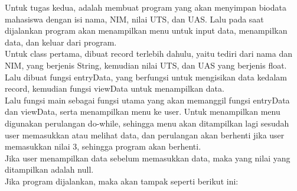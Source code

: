 \documentclass[a4paper,12pt]{article}
\begin{document}
Untuk tugas kedua, adalah membuat program yang akan menyimpan biodata mahasiswa dengan isi nama, NIM, nilai UTS,
dan UAS. Lalu pada saat dijalankan program akan menampilkan menu untuk input data, menampilkan data, dan keluar dari
program.\\
Untuk class pertama, dibuat record terlebih dahulu, yaitu tediri dari nama dan NIM, yang berjenis String, kemudian nilai
UTS, dan UAS yang berjenis float.\\
Lalu dibuat fungsi entryData, yang berfungsi untuk mengisikan data kedalam record, kemudian fungsi viewData untuk
menampilkan data.\\
Lalu fungsi main sebagai fungsi utama yang akan memanggil fungsi entryData dan viewData, serta menampilkan menu ke user.
Untuk menampilkan menu digunakan perulangan do-while, sehingga menu akan ditampilkan lagi sesudah user memasukkan atau
melihat data, dan perulangan akan berhenti jika user memasukkan nilai 3, sehingga program akan berhenti.\\
Jika user menampilkan data sebelum memasukkan data, maka yang nilai yang ditampilkan adalah null.\\
Jika program dijalankan, maka akan tampak seperti berikut ini:
\end{document}
